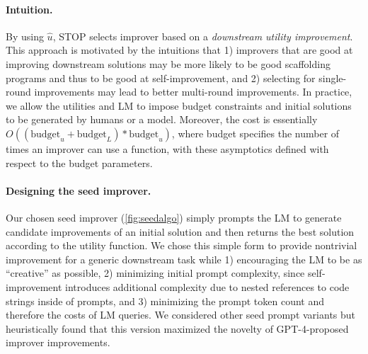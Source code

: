 \documentclass{article} %
\newcommand{\metautil}{{\hat{u}}}
\begin{document}
\paragraph{Intuition.} By using $\metautil$, STOP selects improver based on a \textit{downstream utility improvement}. This approach is motivated by the intuitions that 1) improvers that are good at improving downstream solutions may be more likely to be good scaffolding programs and thus to be good at self-improvement, and 2) selecting for single-round improvements may lead to better multi-round improvements. 
%
%
%
%
%
%
%
%
%
%
%
%
%
%
%
In practice, we allow the utilities and LM to impose budget constraints
%
and initial solutions to be generated by humans or a model. 
%
%
%
%
Moreover, the cost is essentially $O((\mathrm{budget}_u + \mathrm{budget}_{L}) * \mathrm{budget}_\metautil)$, where budget specifies the number of times an improver can use a function, with these asymptotics defined with respect to the budget parameters.



\paragraph{Designing the seed improver.}
Our chosen seed improver (\cref{fig:seedalgo}) simply prompts the LM to generate candidate improvements of an initial solution and then returns the best solution according to the utility function. 
%
%
%
%
%
%
%
We chose this simple form to provide nontrivial improvement for a generic downstream task while 1) encouraging the LM to be as ``creative'' as possible, 2) minimizing initial prompt complexity, since self-improvement introduces additional complexity due to nested references to code strings inside of prompts, 
%
and 3) minimizing the prompt token count and therefore the costs of LM queries. 
We considered other seed prompt variants but heuristically found that this version maximized the novelty of GPT-4-proposed improver improvements. \vspace{-1px}
%
 
\end{document}
